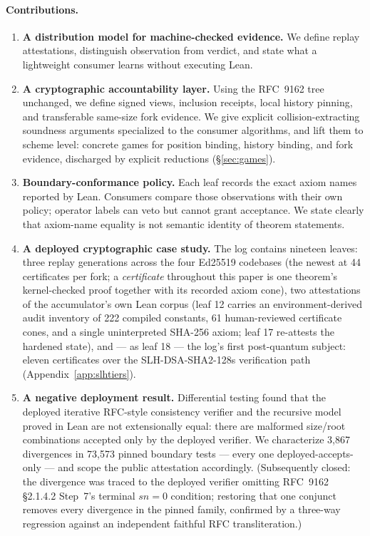 \documentclass[11pt]{article}
\theoremstyle{remark}
\begin{document}
\paragraph{Contributions.}
\begin{enumerate}[leftmargin=1.7em,itemsep=3pt]
\item \textbf{A distribution model for machine-checked evidence.}
We define replay attestations, distinguish observation from verdict, and state
what a lightweight consumer learns without executing Lean.
\item \textbf{A cryptographic accountability layer.}
Using the RFC~9162 tree unchanged, we define signed views, inclusion receipts,
local history pinning, and transferable same-size fork evidence. We give
explicit collision-extracting soundness arguments specialized to the consumer
algorithms, and lift them to scheme level: concrete games for position
binding, history binding, and fork evidence, discharged by explicit
reductions (\S\ref{sec:games}).
\item \textbf{Boundary-conformance policy.}
Each leaf records the exact axiom names reported by Lean. Consumers compare
those observations with their own policy; operator labels can veto but cannot
grant acceptance. We state clearly that axiom-name equality is not semantic
identity of theorem statements.
\item \textbf{A deployed cryptographic case study.}
The log contains nineteen leaves: three replay generations across the four
Ed25519 codebases (the newest at 44 certificates per fork; a \emph{certificate} throughout this paper is one theorem's kernel-checked proof together with its recorded axiom cone), two attestations
of the accumulator's own Lean corpus (leaf 12 carries an environment-derived
audit inventory of 222 compiled constants, 61 human-reviewed certificate
cones, and a single uninterpreted SHA-256 axiom; leaf 17 re-attests the
hardened state), and --- as leaf 18 --- the log's first post-quantum subject:
eleven certificates over the SLH-DSA-SHA2-128s verification path
(Appendix~\ref{app:slhtiers}).
\item \textbf{A negative deployment result.}
Differential testing found that the deployed iterative RFC-style consistency
verifier and the recursive model proved in Lean are not extensionally equal:
there are malformed size/root combinations accepted only by the deployed
verifier. We characterize 3,867 divergences in 73,573 pinned boundary tests
--- every one deployed-accepts-only --- and scope the public attestation
accordingly. (Subsequently closed: the divergence was traced to
the deployed verifier omitting RFC~9162 \S2.1.4.2 Step~7's terminal
$sn=0$ condition; restoring that one conjunct removes every divergence in the
pinned family, confirmed by a three-way regression against an independent
faithful RFC transliteration.)
\end{enumerate}
\end{document}
